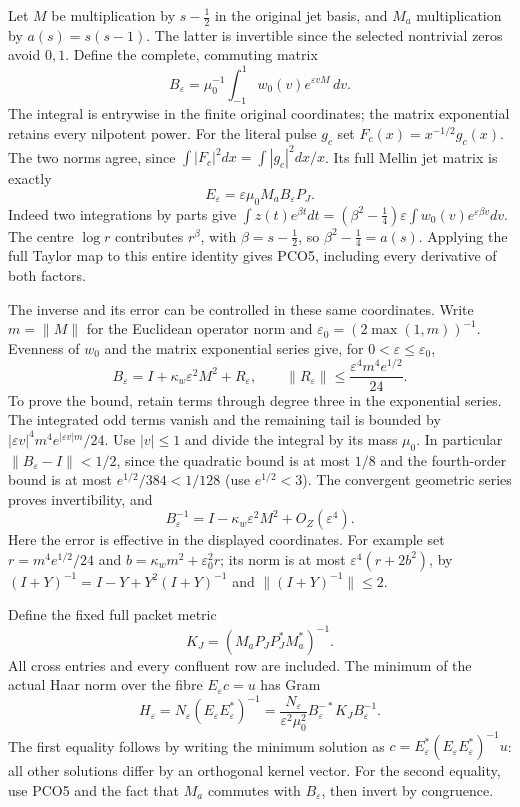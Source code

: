 \documentclass[11pt,a4paper]{article}
\theoremstyle{definition}\newtheorem{definition}[theorem]{Definition}
\begin{document}
Let $M$ be multiplication by $s-\frac12$ in the original jet
basis, and $M_a$ multiplication by $a(s)=s(s-1)$. The latter
is invertible since the selected nontrivial zeros avoid $0,1$.
Define the complete, commuting matrix
\[
 B_\varepsilon=\mu_0^{-1}\int_{-1}^1
                 w_0(v)e^{\varepsilon vM}\,dv.
 \tag{PCO4}\label{pco:unit}
\]
The integral is entrywise in the finite original coordinates;
the matrix exponential retains every nilpotent power. For the
literal pulse $g_c$ set $F_c(x)=x^{-1/2}g_c(x)$. The two norms
agree, since $\int|F_c|^2dx=\int|g_c|^2dx/x$. Its full Mellin
jet matrix is exactly
\[
 E_\varepsilon=\varepsilon\mu_0 M_a B_\varepsilon P_J.
 \tag{PCO5}\label{pco:observation}
\]
Indeed two integrations by parts give
$\int z(t)e^{\beta t}dt=(\beta^2-\frac14)
\varepsilon\int w_0(v)e^{\varepsilon\beta v}dv$.
The centre $\log r$ contributes $r^\beta$, with
$\beta=s-\frac12$, so $\beta^2-\frac14=a(s)$.
Applying the full Taylor map to this entire identity gives
PCO5, including every derivative of both factors.

The inverse and its error can be controlled in these same
coordinates. Write $m=\|M\|$ for the Euclidean operator norm
and $\varepsilon_0=(2\max(1,m))^{-1}$. Evenness of $w_0$ and
the matrix exponential series give, for $0<\varepsilon\le
\varepsilon_0$,
\[
 B_\varepsilon=I+\kappa_w\varepsilon^2M^2+R_\varepsilon,
 \qquad
 \|R_\varepsilon\|\le
       \frac{\varepsilon^4m^4e^{1/2}}{24}.
 \tag{PCO6}\label{pco:remainder}
\]
To prove the bound, retain terms through degree three in the
exponential series. The integrated odd terms vanish and the
remaining tail is bounded by
$|\varepsilon v|^4m^4e^{|\varepsilon v|m}/24$.
Use $|v|\le1$ and divide the integral by its mass $\mu_0$.
In particular $\|B_\varepsilon-I\|<1/2$, since the quadratic
bound is at most $1/8$ and the fourth-order bound is at most
$e^{1/2}/384<1/128$ (use $e^{1/2}<3$).
The convergent geometric series proves invertibility, and
\[
 B_\varepsilon^{-1}=I-\kappa_w\varepsilon^2M^2
                              +O_{Z}(\varepsilon^4).
 \tag{PCO7}\label{pco:inverse}
\]
Here the error is effective in the displayed coordinates. For
example set $r=m^4e^{1/2}/24$ and
$b=\kappa_wm^2+\varepsilon_0^2r$; its norm is at most
$\varepsilon^4(r+2b^2)$, by
$(I+Y)^{-1}=I-Y+Y^2(I+Y)^{-1}$ and
$\|(I+Y)^{-1}\|\le2$.

Define the fixed full packet metric
\[
 K_J=(M_aP_JP_J^*M_a^*)^{-1}.
 \tag{PCO8}\label{pco:fixed-metric}
\]
All cross entries and every confluent row are included. The
minimum of the actual Haar norm over the fibre
$E_\varepsilon c=u$ has Gram
\[
 H_\varepsilon
  =N_\varepsilon(E_\varepsilon E_\varepsilon^*)^{-1}
  =\frac{N_\varepsilon}{\varepsilon^2\mu_0^2}
                B_\varepsilon^{-*}K_JB_\varepsilon^{-1}.
 \tag{PCO9}\label{pco:attained}
\]
The first equality follows by writing the minimum solution as
$c=E_\varepsilon^*(E_\varepsilon E_\varepsilon^*)^{-1}u$:
all other solutions differ by an orthogonal kernel vector.
For the second equality, use PCO5 and the fact that $M_a$
commutes with $B_\varepsilon$, then invert by congruence.
\end{document}
